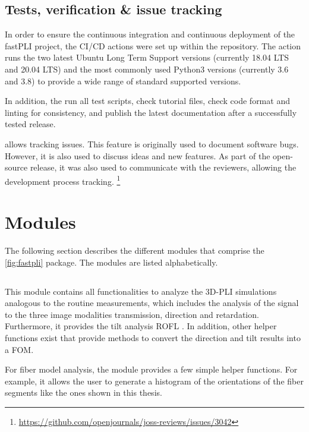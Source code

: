\subsection{Tests, verification \& issue tracking}
%
In order to ensure the continuous integration and continuous deployment of the \ac{fastPLI} project, the CI/CD actions were set up within the  repository.
The action runs the two latest Ubuntu Long Term Support versions (currently 18.04 LTS and 20.04 LTS) and the most commonly used Python3 versions (currently 3.6 and 3.8) to provide a wide range of standard supported versions.
\par
%
In addition, the  run all test scripts, check tutorial files, check code format and linting for consistency, and publish the latest documentation after a successfully tested release.
\par
%
 allows tracking issues.
This feature is originally used to document software bugs.
However, it is also used to discuss ideas and new features.
As part of the open-source release, it was also used to communicate with the reviewers, allowing the development process tracking.
\footnote{\url{https://github.com/openjournals/joss-reviews/issues/3042}}
%
%
%
\section{Modules}
%
The following section describes the different modules that comprise the \cref{fig:fastpli} \python{} package.
The modules are listed alphabetically.
%
%
%
\subsection{}
%
This module contains all functionalities to analyze the \ac{3D-PLI} simulations analogous to the routine measurements, which includes the analysis of the signal to the three image modalities transmission, direction and retardation.
Furthermore, it provides the tilt analysis \ac{ROFL} \cite{Schmitz2018}.
In addition, other helper functions exist that provide methods to convert the direction and tilt results into a \ac{FOM}.
\par
%
For fiber model analysis, the module provides a few simple helper functions.
For example, it allows the user to generate a histogram of the orientations of the fiber segments like the ones shown in this thesis.
%
%
%
